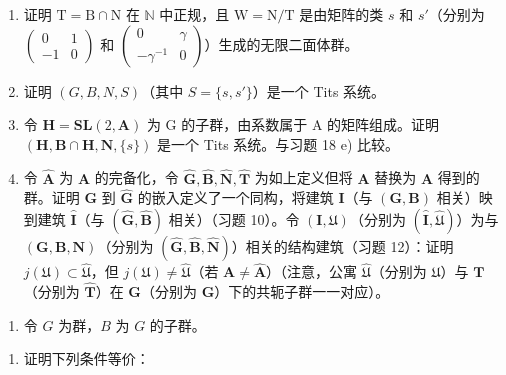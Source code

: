 \begin{enumerate}
\def\labelenumi{\alph{enumi})}
\item
  证明 \(\mathrm{T} = \mathrm{B} \cap \mathrm{N}\) 在 \(\mathbb{N}\) 中正规，且 \(\mathrm{W} = \mathrm{N} / \mathrm{T}\) 是由矩阵的类 \(s\) 和 \(s'\)（分别为 \(\left( \begin{array}{cc}0 & 1\\ -1 & 0 \end{array} \right)\) 和 \(\left( \begin{array}{cc}0 & \gamma \\ -\gamma^{-1} & 0 \end{array} \right)\)）生成的无限二面体群。
\item
  证明 \((G, B, N, S)\)（其中 \(S = \{s, s'\}\)）是一个 Tits 系统。
\item
  令 \(\mathbf{H} = \mathbf{SL}(2, \mathbf{A})\) 为 G 的子群，由系数属于 A 的矩阵组成。证明 \((\mathbf{H}, \mathbf{B} \cap \mathbf{H}, \mathbf{N}, \{s\})\) 是一个 Tits 系统。与习题 18 e) 比较。
\item
  令 \(\hat{\mathbf{A}}\) 为 \(\mathbf{A}\) 的完备化，令 \(\hat{\mathbf{G}},\hat{\mathbf{B}},\hat{\mathbf{N}},\hat{\mathbf{T}}\) 为如上定义但将 \(\mathbf{A}\) 替换为 \(\hat{\mathbf{A}}\) 得到的群。证明 \(\mathbf{G}\) 到 \(\hat{\mathbf{G}}\) 的嵌入定义了一个同构，将建筑 \(\mathbf{I}\)（与 \((\mathbf{G},\mathbf{B})\) 相关）映到建筑 \(\hat{\mathbf{I}}\)（与 \((\hat{\mathbf{G}},\hat{\mathbf{B}})\) 相关）（习题 10）。令 \((\mathbf{I},\mathfrak{U})\)（分别为 \((\hat{\mathbf{I}},\hat{\mathfrak{U}})\)）为与 \((\mathbf{G},\mathbf{B},\mathbf{N})\)（分别为 \((\hat{\mathbf{G}},\hat{\mathbf{B}},\hat{\mathbf{N}})\)）相关的结构建筑（习题 12）：证明 \(j(\mathfrak{U})\subset \hat{\mathfrak{U}}\)，但 \(j(\mathfrak{U})\neq \hat{\mathfrak{U}}\)（若 \(\mathbf{A}\neq \hat{\mathbf{A}}\)）（注意，公寓 \(\hat{\mathfrak{U}}\)（分别为 \(\mathfrak{U}\)）与 \(\mathbf{T}\)（分别为 \(\hat{\mathbf{T}}\)）在 \(\mathbf{G}\)（分别为 \(\hat{\mathbf{G}}\)）下的共轭子群一一对应）。
\end{enumerate}

\begin{enumerate}
\def\labelenumi{\arabic{enumi})}
\setcounter{enumi}{21}
\tightlist
\item
  令 \(G\) 为群，\(B\) 为 \(G\) 的子群。
\end{enumerate}

\begin{enumerate}
\def\labelenumi{\alph{enumi})}
\tightlist
\item
  证明下列条件等价：
\end{enumerate}

